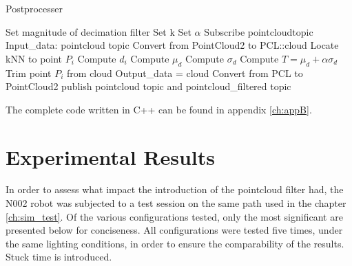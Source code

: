 \begin{algorithm}[H]
\caption{Postprocesser}\label{alg:postprocesser}
\begin{algorithmic}
\STATE Set magnitude of decimation filter
\STATE Set k
\STATE Set $\alpha$
\STATE Subscribe pointcloudtopic
\STATE Input\_data: pointcloud topic
    \STATE Convert from PointCloud2 to PCL::cloud
    \STATE Locate kNN to point $P_i$
    \STATE Compute $d_i$ 
\ENDFOR
\STATE Compute $\mu_d$
\STATE Compute $\sigma_d$
\STATE Compute $T = \mu_d + \alpha \sigma_d$
\STATE Trim point $P_i$ from cloud
\ENDIF
\STATE Output\_data = cloud
    \STATE Convert from PCL to PointCloud2
\ENDFOR
\STATE publish pointcloud topic and pointcloud\_filtered topic
\end{algorithmic}
\end{algorithm}

The complete code written in C++ can be found in appendix \ref{ch:appB}. 
\section{Experimental Results}
\label{section: experimentalpcl}
In order to assess what impact the introduction of the pointcloud filter had, the N002 robot was subjected to a test session on the same path used in the chapter \ref{ch:sim_test}. Of the various configurations tested, only the most significant are presented below for conciseness. All configurations were tested five times, under the same lighting conditions, in order to ensure the comparability of the results. Stuck time is introduced.
